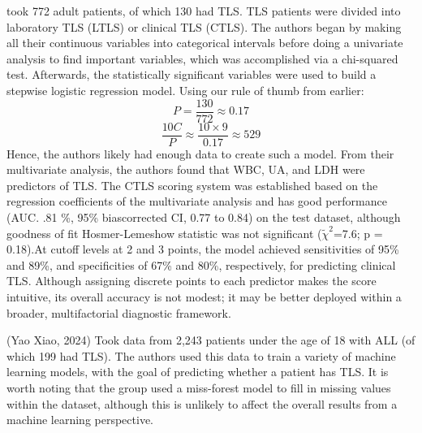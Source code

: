 \documentclass{article}
\begin{document}
\cite{montesinos2008tumor} took 772 adult patients, of which 130 had TLS. TLS patients were divided into laboratory TLS (LTLS) or clinical TLS (CTLS). The authors began by making all their continuous variables into categorical intervals before doing a univariate analysis to find important variables, which was accomplished via a chi-squared test. Afterwards, the statistically significant variables were used to build a stepwise logistic regression model. Using our rule of thumb from earlier:
\[P =\frac{130}{772} \approx 0.17 \]
\[ \frac{10C}{P} \approx \frac{10\times9}{0.17} \approx 529 \]
Hence, the authors likely had enough data to create such a model. From their multivariate analysis, the authors found that WBC, UA, and LDH were predictors of TLS. 
The CTLS scoring system was established based on the regression coefficients of the multivariate analysis and has good performance (AUC. .81 \%, 95\% bias\-corrected CI, 0.77 to 0.84) on the test dataset, although goodness of fit Hosmer-Lemeshow statistic was not significant (\(\tilde{\chi}^2\)=7.6; p = 0.18).At cut\-off levels at 2 and 3 points, the model achieved sensitivities of 95\% and 89\%, and specificities of 67\% and 80\%, respectively, for predicting clinical TLS. Although assigning discrete points to each predictor makes the score intuitive, its overall accuracy is not modest; it may be better deployed within a broader, multifactorial diagnostic framework.

(Yao Xiao, 2024) Took data from 2,243 patients under the age of 18 with ALL (of which 199 had TLS). The authors used this data to train a variety of machine learning models, with the goal of predicting whether a patient has TLS. It is worth noting that the group used a miss-forest model to fill in missing values within the dataset, although this is unlikely to affect the overall results from a machine learning perspective.
\end{document}
